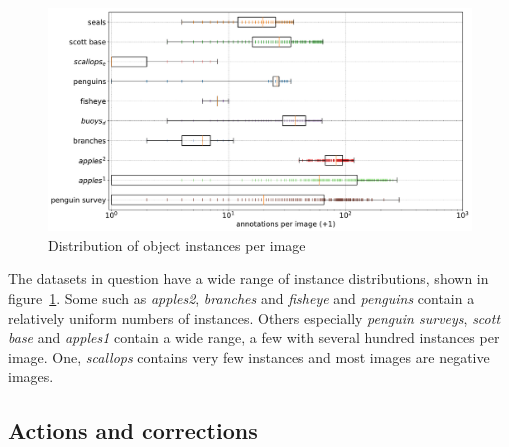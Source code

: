 \begin{figure}[ht]
\centering
\includegraphics[width=1.0\linewidth]{charts/summaries/instances_boxplot.pdf}
\caption{ Distribution of object instances per image }
\label{fig:instances_image_plot}
\end{figure}

The datasets in question have a wide range of instance distributions, shown in figure~\ref{fig:instances_image_plot}. Some such as \emph{apples2}, \emph{branches} and \emph{fisheye} and \emph{penguins} contain a relatively uniform numbers of instances. Others especially \emph {penguin surveys}, \emph{scott base} and \emph{apples1} contain a wide range, a few with several hundred instances per image. One, \emph{scallops} contains very few instances and most images are negative images.


\subsection {Actions and corrections}

